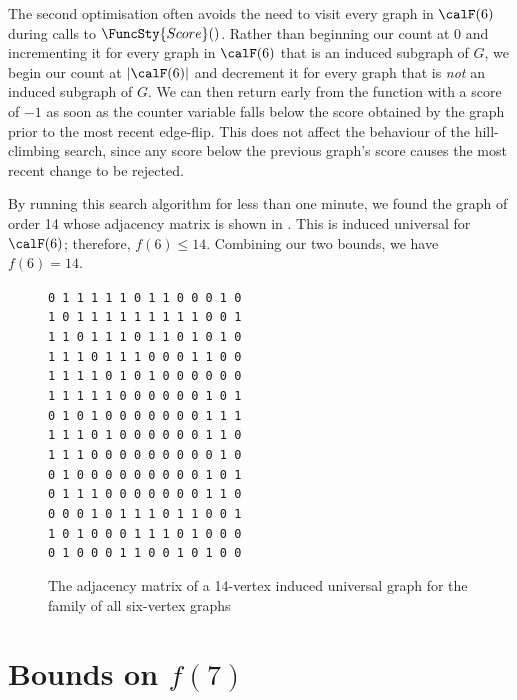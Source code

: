 The second optimisation often avoids the need to visit every graph in $\calF(6)$
during calls to $\FuncSty{Score}()$.  Rather than beginning our count at 0
and incrementing it for every graph in $\calF(6)$ that is an induced subgraph
of $G$, we begin our count at $|\calF(6)|$ and decrement it for every
graph that is \emph{not} an induced subgraph of $G$.  We can then return
early from the function with a score of $-1$ as soon as the counter variable
falls below the score obtained by the graph prior to the most recent edge-flip.
This does not affect the behaviour of the hill-climbing search, since any
score below the previous graph's score causes the most recent change
to be rejected.

By running this search algorithm for less than one minute, we found the graph of
order 14 whose adjacency matrix is shown in .  This is induced
universal for $\calF(6)$; therefore, $f(6) \leq 14$.  Combining our two bounds, we
have $f(6) = 14$.

\begin{figure}[htb]
\centering
\scriptsize
\verb|0 1 1 1 1 1 0 1 1 0 0 0 1 0| \\
\verb|1 0 1 1 1 1 1 1 1 1 1 0 0 1| \\
\verb|1 1 0 1 1 1 0 1 1 0 1 0 1 0| \\
\verb|1 1 1 0 1 1 1 0 0 0 1 1 0 0| \\
\verb|1 1 1 1 0 1 0 1 0 0 0 0 0 0| \\
\verb|1 1 1 1 1 0 0 0 0 0 0 1 0 1| \\
\verb|0 1 0 1 0 0 0 0 0 0 0 1 1 1| \\
\verb|1 1 1 0 1 0 0 0 0 0 0 1 1 0| \\
\verb|1 1 1 0 0 0 0 0 0 0 0 0 1 0| \\
\verb|0 1 0 0 0 0 0 0 0 0 0 1 0 1| \\
\verb|0 1 1 1 0 0 0 0 0 0 0 1 1 0| \\
\verb|0 0 0 1 0 1 1 1 0 1 1 0 0 1| \\
\verb|1 0 1 0 0 0 1 1 1 0 1 0 0 0| \\
\verb|0 1 0 0 0 1 1 0 0 1 0 1 0 0|
\caption{The adjacency matrix of a 14-vertex induced universal graph for the family of all
six-vertex graphs}
\label{fig:adjmat14}
\end{figure}

\section{Bounds on \texorpdfstring{$f(7)$}{f(7)}}\label{sec:f7}

